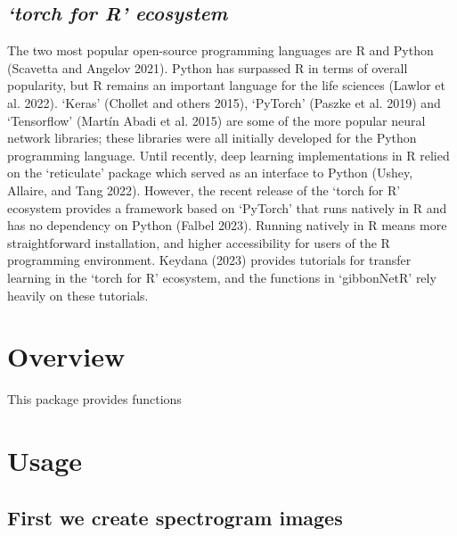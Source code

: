 \documentclass{article}
\begin{document}
\hypertarget{torch-for-r-ecosystem}{%
\subsection{\texorpdfstring{\emph{`torch for R'
ecosystem}}{`torch for R' ecosystem}}\label{torch-for-r-ecosystem}}

The two most popular open-source programming languages are R and Python
(Scavetta and Angelov 2021). Python has surpassed R in terms of overall
popularity, but R remains an important language for the life sciences
(Lawlor et al. 2022). `Keras' (Chollet and others 2015), `PyTorch'
(Paszke et al. 2019) and `Tensorflow' (Martín Abadi et al. 2015) are
some of the more popular neural network libraries; these libraries were
all initially developed for the Python programming language. Until
recently, deep learning implementations in R relied on the `reticulate'
package which served as an interface to Python (Ushey, Allaire, and Tang
2022). However, the recent release of the `torch for R' ecosystem
provides a framework based on `PyTorch' that runs natively in R and has
no dependency on Python (Falbel 2023). Running natively in R means more
straightforward installation, and higher accessibility for users of the
R programming environment. Keydana (2023) provides tutorials for
transfer learning in the `torch for R' ecosystem, and the functions in
`gibbonNetR' rely heavily on these tutorials.

\hypertarget{overview}{%
\section{Overview}\label{overview}}

This package provides functions

\hypertarget{usage}{%
\section{Usage}\label{usage}}

\hypertarget{first-we-create-spectrogram-images}{%
\subsection{First we create spectrogram
images}\label{first-we-create-spectrogram-images}}
\end{document}
